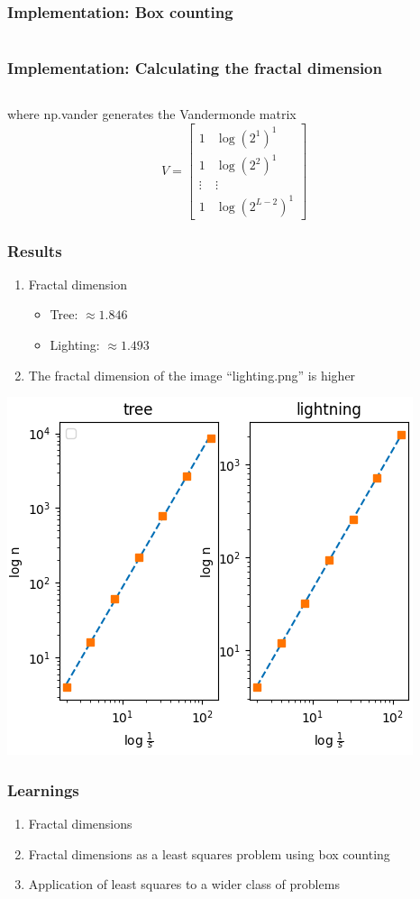 \documentclass[10pt,aspectratio=169,handout]{beamer}
\begin{document}
\begin{frame}
    \frametitle{Implementation: Box counting}
    \inputminted[bgcolor=LightGray,fontsize=\small]{python}{box_counting.py}
\end{frame}

\begin{frame}
    \frametitle{Implementation: Calculating the fractal dimension}
    \inputminted[bgcolor=LightGray,fontsize=\small]{python}{get_slope.py}
    where np.vander generates the Vandermonde matrix
    \[V=\begin{bmatrix}
        1 & \log(2^1)^1\\
        1 & \log(2^2)^1\\
        \vdots & \vdots \\
        1 & \log(2^{L-2})^1
    \end{bmatrix}\]
\end{frame}

\begin{frame}
    \frametitle{Results}

    \begin{minipage}{0.45\textwidth}
        \begin{enumerate}
            \item Fractal dimension\begin{itemize}
                \item Tree: $\approx 1.846$
                \item Lighting: $\approx1.493$
            \end{itemize}
            \item The fractal dimension of the image ``lighting.png'' is higher
        \end{enumerate}
    \end{minipage}
    \begin{minipage}{0.45\textwidth}
        \includegraphics[scale=0.4]{images/plots.png}
    \end{minipage}
\end{frame}

\begin{frame}
    \frametitle{Learnings}
    \begin{enumerate}
        \item Fractal dimensions
        \item Fractal dimensions as a least squares problem using box counting
        \item Application of least squares to a wider class of problems
    \end{enumerate}
\end{frame}
\end{document}
